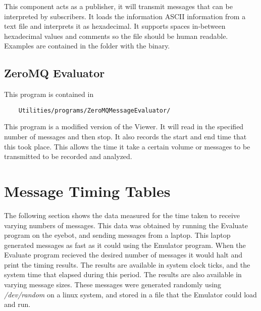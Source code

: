 This component acts as a publisher, it will transmit messages that can be interpreted by subscribers. It loads the information ASCII information from a text file and interprets it as hexadecimal. It supports spaces in-between hexadecimal values and comments so the file should be human readable. Examples are contained in the folder with the binary.

\section{ZeroMQ Evaluator}

This program is contained in 

\begin{verbatim}
	Utilities/programs/ZeroMQMessageEvaluator/
\end{verbatim}

This program is a modified version of the Viewer. It will read in the specified number of messages and then stop. It also records the start and end time that this took place. This allows the time it take a certain volume or messages to be transmitted to be recorded and analyzed.

\chapter{Message Timing Tables}
\label{app:sec:timing}

The following section shows the data measured for the time taken to receive varying numbers of messages. This data was obtained by running the Evaluate program on the eyebot, and sending messages from a laptop. This laptop generated messages as fast as it could using the Emulator program. When the Evaluate program recieved the desired number of messages it would halt and print the timing results.  The results are available in system clock ticks, and the system time  that elapsed during this period. The results are also available in varying message sizes. These messages were generated randomly using \emph{/dev/random} on a linux system, and stored in a file that the Emulator could load and run.

